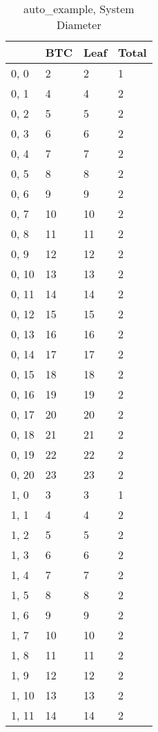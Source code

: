 \begin{table}
\centering
\caption{auto_example, System Diameter}
\label{auto_example_diam}
\begin{tabular}{llll}
\toprule
{} &  BTC & Leaf & Total \\
\midrule
0, 0   &    2 &    2 &     1 \\
0, 1   &    4 &    4 &     2 \\
0, 2   &    5 &    5 &     2 \\
0, 3   &    6 &    6 &     2 \\
0, 4   &    7 &    7 &     2 \\
0, 5   &    8 &    8 &     2 \\
0, 6   &    9 &    9 &     2 \\
0, 7   &   10 &   10 &     2 \\
0, 8   &   11 &   11 &     2 \\
0, 9   &   12 &   12 &     2 \\
0, 10  &   13 &   13 &     2 \\
0, 11  &   14 &   14 &     2 \\
0, 12  &   15 &   15 &     2 \\
0, 13  &   16 &   16 &     2 \\
0, 14  &   17 &   17 &     2 \\
0, 15  &   18 &   18 &     2 \\
0, 16  &   19 &   19 &     2 \\
0, 17  &   20 &   20 &     2 \\
0, 18  &   21 &   21 &     2 \\
0, 19  &   22 &   22 &     2 \\
0, 20  &   23 &   23 &     2 \\
1, 0   &    3 &    3 &     1 \\
1, 1   &    4 &    4 &     2 \\
1, 2   &    5 &    5 &     2 \\
1, 3   &    6 &    6 &     2 \\
1, 4   &    7 &    7 &     2 \\
1, 5   &    8 &    8 &     2 \\
1, 6   &    9 &    9 &     2 \\
1, 7   &   10 &   10 &     2 \\
1, 8   &   11 &   11 &     2 \\
1, 9   &   12 &   12 &     2 \\
1, 10  &   13 &   13 &     2 \\
1, 11  &   14 &   14 &     2 \\

\end{tabular}
\end{table}
